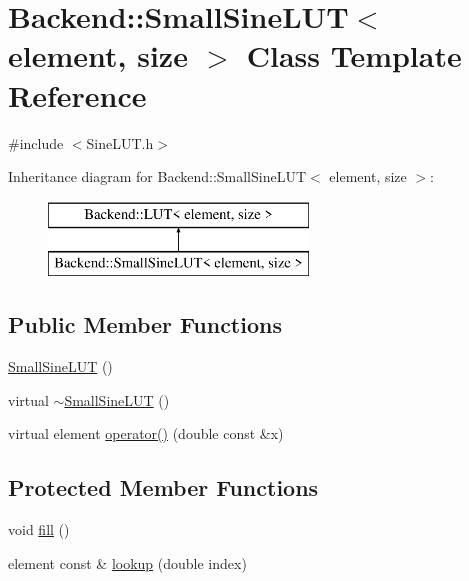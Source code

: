 \hypertarget{class_backend_1_1_small_sine_l_u_t}{\section{Backend\+:\+:Small\+Sine\+L\+U\+T$<$ element, size $>$ Class Template Reference}
\label{class_backend_1_1_small_sine_l_u_t}
}


{\ttfamily \#include $<$Sine\+L\+U\+T.\+h$>$}

Inheritance diagram for Backend\+:\+:Small\+Sine\+L\+U\+T$<$ element, size $>$\+:\begin{figure}[H]
\begin{center}
\leavevmode
\includegraphics[height=2.000000cm]{class_backend_1_1_small_sine_l_u_t}
\end{center}
\end{figure}
\subsection*{Public Member Functions}
\begin{DoxyCompactItemize}
\item 
\hyperlink{class_backend_1_1_small_sine_l_u_t_aa89687103cd20a258e5623ace804bf09}{Small\+Sine\+L\+U\+T} ()
\item 
virtual \hyperlink{class_backend_1_1_small_sine_l_u_t_a75767a2ebad8a8c4d8a4a54b7c61bb0e}{$\sim$\+Small\+Sine\+L\+U\+T} ()
\item 
virtual element \hyperlink{class_backend_1_1_small_sine_l_u_t_a2b6fdef4f825da7555ca4002f1dd94af}{operator()} (double const \&x)
\end{DoxyCompactItemize}
\subsection*{Protected Member Functions}
\begin{DoxyCompactItemize}
\item 
void \hyperlink{class_backend_1_1_small_sine_l_u_t_a981ef95660709f9a796dc176e4c66cf3}{fill} ()
\item 
element const \& \hyperlink{class_backend_1_1_small_sine_l_u_t_ab4403a4852d61cef8199a3f2cb313c57}{lookup} (double index)
\end{DoxyCompactItemize}
